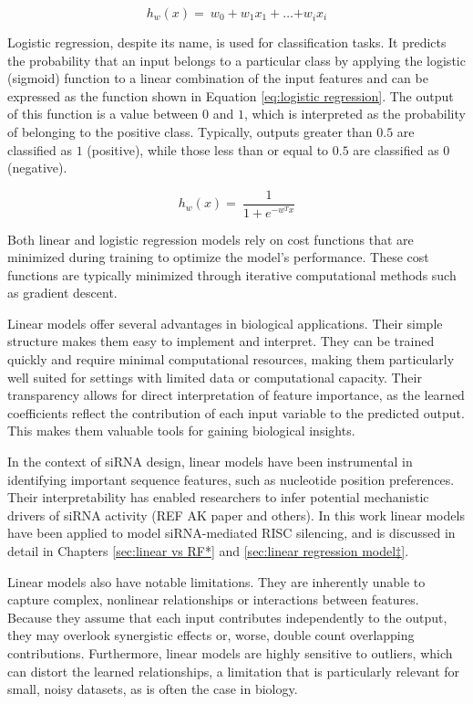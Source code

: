 \documentclass{report}
\begin{document}
\begin{equation}\label{eq:linear regression}
h_w\left(x\right)=\ w_0+w_1x_1+\ldots{+w}_ix_i
\end{equation}

Logistic regression, despite its name, is used for classification tasks. It predicts the probability that an input belongs to a particular class by applying the logistic (sigmoid) function to a linear combination of the input features and can be expressed as the function shown in Equation \ref{eq:logistic regression}. The output of this function is a value between $0$ and $1$, which is interpreted as the probability of belonging to the positive class. Typically, outputs greater than $0.5 $ are classified as $1$ (positive), while those less than or equal to $0.5$ are classified as $0$ (negative).

\begin{equation}\label{eq:logistic regression}
h_w\left(x\right)=\ \frac{1}{1+e^{{-w}^Tx}}
\end{equation}

Both linear and logistic regression models rely on cost functions that are minimized during training to optimize the model’s performance. These cost functions are typically minimized through iterative computational methods such as gradient descent.

Linear models offer several advantages in biological applications. Their simple structure makes them easy to implement and interpret. They can be trained quickly and require minimal computational resources, making them particularly well suited for settings with limited data or computational capacity. Their transparency allows for direct interpretation of feature importance, as the learned coefficients reflect the contribution of each input variable to the predicted output. This makes them valuable tools for gaining biological insights.

In the context of siRNA design, linear models have been instrumental in identifying important sequence features, such as nucleotide position preferences. Their interpretability has enabled researchers to infer potential mechanistic drivers of siRNA activity (REF AK paper and others). In this work linear models have been applied to model siRNA-mediated RISC silencing, and is discussed in detail in Chapters \ref{sec:linear vs RF*} and \ref{sec:linear regression model‡}.

Linear models also have notable limitations. They are inherently unable to capture complex, nonlinear relationships or interactions between features. Because they assume that each input contributes independently to the output, they may overlook synergistic effects or, worse, double count overlapping contributions. Furthermore, linear models are highly sensitive to outliers, which can distort the learned relationships, a limitation that is particularly relevant for small, noisy datasets, as is often the case in biology.
\end{document}
